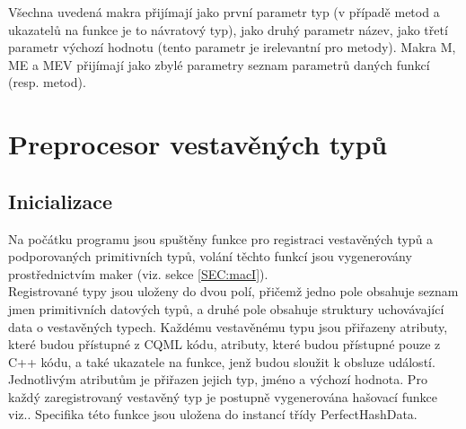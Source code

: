 \documentclass[report,11pt]{elsarticle}
\begin{document}
Všechna uvedená makra přijímají jako první parametr typ (v případě metod a ukazatelů na funkce je to návratový typ), jako druhý parametr název, jako třetí parametr výchozí hodnotu (tento parametr je irelevantní pro metody). Makra M, ME a MEV přijímají jako zbylé parametry seznam parametrů daných funkcí (resp. metod).\\



\section{\label{SEC:aa}Preprocesor vestavěných typů}
\subsection{Inicializace}
Na počátku programu jsou spuštěny funkce pro registraci vestavěných typů a podporovaných primitivních typů, volání těchto funkcí jsou vygenerovány prostřednictvím maker (viz. sekce \ref{SEC:macI}).\\
Registrované typy jsou uloženy do dvou polí, přičemž jedno pole obsahuje seznam jmen primitivních datových typů, a druhé pole obsahuje struktury uchovávající data o vestavěných typech. Každému vestavěnému typu jsou přiřazeny atributy, které budou přístupné z CQML kódu, atributy, které budou přístupné pouze z C++ kódu, a také ukazatele na funkce, jenž budou sloužit k obsluze událostí. Jednotlivým atributům je přiřazen jejich typ, jméno a výchozí hodnota. Pro každý zaregistrovaný vestavěný typ je postupně vygenerována hašovací funkce viz.. Specifika této funkce jsou uložena do instancí třídy PerfectHashData. \\
\end{document}
